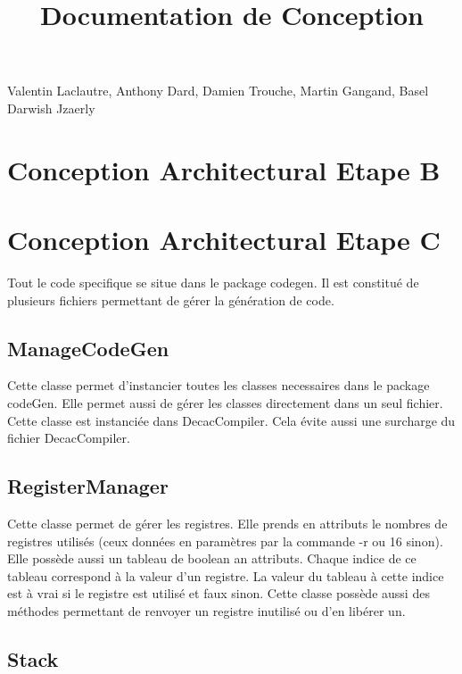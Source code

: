 \documentclass[12pt, a4paper, one side]{article}
\title{Documentation de Conception}
\author{}
\date{}
\begin{document}
\maketitle

\begin{center}
    Valentin Laclautre, Anthony Dard, Damien Trouche, Martin Gangand, Basel Darwish Jzaerly
\end{center}

\tableofcontents
\newpage

\section{Conception Architectural Etape B}

\section{Conception Architectural Etape C}

Tout le code specifique se situe dans le package codegen. Il est constitué de plusieurs fichiers
permettant de gérer la génération de code.

\subsection{ManageCodeGen}

Cette classe permet d'instancier toutes les classes necessaires dans le package codeGen. Elle permet
aussi de gérer les classes directement dans un seul fichier. Cette classe est instanciée dans
DecacCompiler. Cela évite aussi une surcharge du fichier DecacCompiler.

\subsection{RegisterManager}

Cette classe permet de gérer les registres. Elle prends en attributs le nombres de registres utilisés
(ceux données en paramètres par la commande -r ou 16 sinon). Elle possède aussi un tableau de boolean
an attributs. Chaque indice de ce tableau correspond à la valeur d'un registre. La valeur du tableau
à cette indice est à vrai si le registre est utilisé et faux sinon. Cette classe possède aussi des
méthodes permettant de renvoyer un registre inutilisé ou d'en libérer un.

\subsection{Stack}
\end{document}
